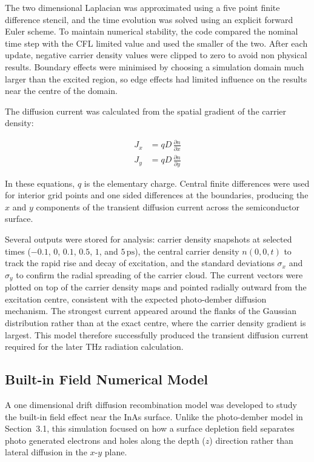 \documentclass[12pt]{final_project_report}
\begin{document}
The two dimensional Laplacian was approximated using a five point finite difference stencil, and the time evolution was solved using an explicit forward Euler scheme. To maintain numerical stability, the code compared the nominal time step with the CFL limited value and used the smaller of the two. After each update, negative carrier density values were clipped to zero to avoid non physical results. Boundary effects were minimised by choosing a simulation domain much larger than the excited region, so edge effects had limited influence on the results near the centre of the domain.

The diffusion current was calculated from the spatial gradient of the carrier density:

\begin{align}
    J_x &= qD\,\frac{\partial n}{\partial x} \\[6pt]
    J_y &= qD\,\frac{\partial n}{\partial y}
\end{align}

In these equations, $q$ is the elementary charge. Central finite differences were used for interior grid points and one sided differences at the boundaries, producing the $x$ and $y$ components of the transient diffusion current across the semiconductor surface.

Several outputs were stored for analysis: carrier density snapshots at selected times ($-0.1$, $0$, $0.1$, $0.5$, $1$, and $5\,\mathrm{ps}$), the central carrier density $n(0,0,t)$ to track the rapid rise and decay of excitation, and the standard deviations $\sigma_x$ and $\sigma_y$ to confirm the radial spreading of the carrier cloud. The current vectors were plotted on top of the carrier density maps and pointed radially outward from the excitation centre, consistent with the expected photo-dember diffusion mechanism. The strongest current appeared around the flanks of the Gaussian distribution rather than at the exact centre, where the carrier density gradient is largest. This model therefore successfully produced the transient diffusion current required for the later THz radiation calculation.

\subsection{Built-in Field Numerical Model}
A one dimensional drift diffusion recombination model was developed to study the built-in field effect near the InAs surface. Unlike the photo-dember model in Section~3.1, this simulation focused on how a surface depletion field separates photo generated electrons and holes along the depth ($z$) direction rather than lateral diffusion in the $x$-$y$ plane.
\end{document}
